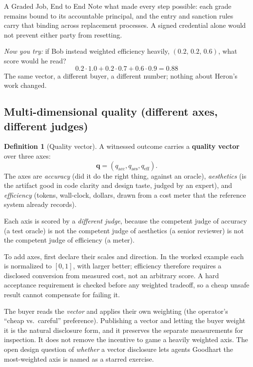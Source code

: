 \documentclass[11pt,a4paper]{article}
\theoremstyle{definition}
\newtheorem{definition}{Definition}[section]
\begin{document}
\begin{pdexample}{A Graded Job, End to End}
Note what made every step possible:
each grade remains bound to its accountable principal, and the entry and
sanction rules carry that binding across replacement processes. A signed
credential alone would not prevent either party from resetting.

\emph{Now you try:} if Bob instead weighted
efficiency heavily, $(0.2,\,0.2,\,0.6)$, what score would he read?
\[
0.2\cdot1.0+0.2\cdot0.7+0.6\cdot0.9=0.88
\]
The same vector, a different buyer, a different number; nothing about Heron's
work changed.
\end{pdexample}

\subsection{Multi-dimensional quality (different axes, different judges)}

\begin{definition}[Quality vector]\label{def:qvec}
\setlength{\parskip}{4pt plus 1pt}
A witnessed outcome carries a \textbf{quality vector} over three axes:
\[
\mathbf{q} = (q_{\text{acc}}, q_{\text{aes}}, q_{\text{eff}}).
\]
The axes are
\emph{accuracy} (did it do the right thing, against an oracle), \emph{aesthetics}
(is the artifact good in code clarity and design taste, judged by an expert),
and \emph{efficiency} (tokens, wall-clock, dollars, drawn from a cost meter that
the reference system already records).

Each axis is scored by a \emph{different
judge}, because the competent judge of accuracy (a test oracle) is not the
competent judge of aesthetics (a senior reviewer) is not the competent judge of
efficiency (a meter).
\end{definition}

\noindent To add axes, first declare their scales and direction. In the worked example
each is normalized to $[0,1]$, with larger better; efficiency therefore
requires a disclosed conversion from measured cost, not an arbitrary score.
A hard acceptance requirement is checked before any weighted tradeoff, so
a cheap unsafe result cannot compensate for failing it.

The buyer reads the \emph{vector} and applies their own weighting (the
operator's ``cheap vs.\ careful'' preference). Publishing a vector and letting the
buyer weight it is the natural disclosure form, and it preserves the separate
measurements for inspection. It does not remove
the incentive to game a heavily weighted axis. The open design question of
\emph{whether} a vector disclosure lets agents Goodhart the most-weighted axis is
named as a starred exercise.
\end{document}
